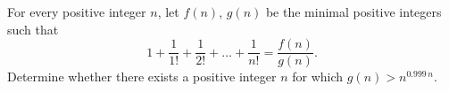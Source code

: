 For every positive integer \(n\), let \(f(n)\), \(g(n)\) be the minimal positive integers such that
\[
1 + \frac{1}{1!} + \frac{1}{2!} + \ldots + \frac{1}{n!} = \frac{f(n)}{g(n)}.
\]
Determine whether there exists a positive integer \(n\) for which \(g(n) > n^{0.999\, n}\).

